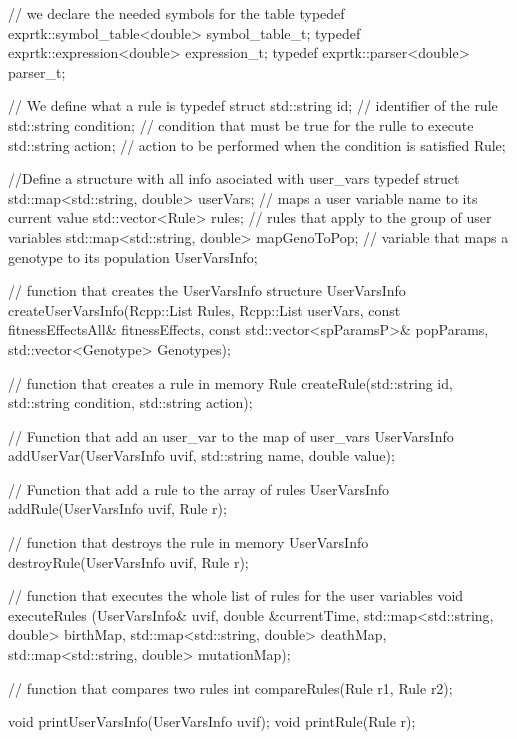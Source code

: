 \begin{CPP}
	// we declare the needed symbols for the table
	typedef exprtk::symbol_table<double> symbol_table_t;
	typedef exprtk::expression<double> expression_t;
	typedef exprtk::parser<double> parser_t;
	
	// We define what a rule is
	typedef struct {
		std::string id; // identifier of the rule
		std::string condition; // condition that must be true for the rulle to execute
		std::string action; // action to be performed when the condition is satisfied
	} Rule;
	
	//Define a structure with all info asociated with user_vars
	typedef struct{
		std::map<std::string, double> userVars; // maps a user variable name to its current value
		std::vector<Rule> rules; // rules that apply to the group of user variables
		std::map<std::string, double> mapGenoToPop; // variable that maps a genotype to its population
	}UserVarsInfo;
	
	// function that creates the UserVarsInfo structure
	UserVarsInfo createUserVarsInfo(Rcpp::List Rules,
	Rcpp::List userVars,
	const fitnessEffectsAll& fitnessEffects, 
	const std::vector<spParamsP>& popParams, 
	std::vector<Genotype> Genotypes);
	
	// function that creates a rule in memory
	Rule createRule(std::string id, 
	std::string condition, 
	std::string action);
	
	// Function that add an user_var to the map of user_vars
	UserVarsInfo addUserVar(UserVarsInfo uvif, std::string name, double value);
	
	// Function that add a rule to the array of rules
	UserVarsInfo addRule(UserVarsInfo uvif, Rule r);
	
	// function that destroys the rule in memory
	UserVarsInfo destroyRule(UserVarsInfo uvif, Rule r);
	
	// function that executes the whole list of rules for the user variables
	void executeRules (UserVarsInfo& uvif,
	double &currentTime,
	std::map<std::string, double> birthMap,
	std::map<std::string, double> deathMap,
	std::map<std::string, double> mutationMap);
	
	// function that compares two rules
	int compareRules(Rule r1, Rule r2);
	
	void printUserVarsInfo(UserVarsInfo uvif);
	void printRule(Rule r);
\end{CPP}